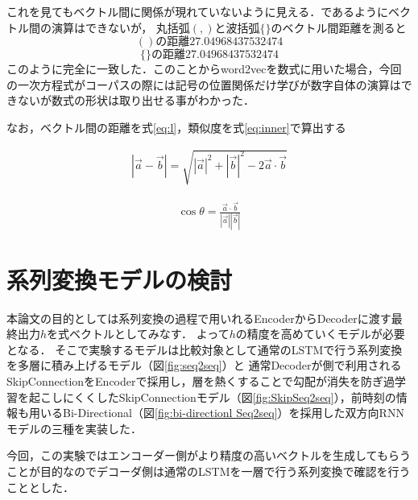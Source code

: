 \documentclass[a4j,11pt,report]{jsbook}
\begin{document}
\begin{multicols}{2}


\end{multicols}



これを見てもベクトル間に関係が現れていないように見える．\cite{seq2seq}であるようにベクトル間の演算はできないが，
丸括弧$(,)$と波括弧$\{ \}$のベクトル間距離を測ると
\[
( ) の距離 27.04968437532474
\]
\[
\{ \} の距離 27.04968437532474
\]
このように完全に一致した．このことからword2vecを数式に用いた場合，今回の一次方程式がコーパスの際には記号の位置関係だけ学びが数字自体の演算はできないが数式の形状は取り出せる事がわかった．

なお，ベクトル間の距離を式\ref{eq:l}，類似度を式\ref{eq:inner}で算出する


\begin{equation}
  \label{eq:l}
  \begin{split}
    |\vec{a}-\vec{b}| =  \sqrt{|\vec{a}|^2 + |\vec{b}|^2 - 2  \vec{a} \cdot \vec{b}}
  \end{split}
\end{equation}

\begin{equation}
  \label{eq:inner}
  \begin{split}
    \cos \theta = \frac{\vec{a} \cdot \vec{b}}{|\vec{a}| |\vec{b}|}
  \end{split}
\end{equation}

\section{系列変換モデルの検討}
本論文の目的としては系列変換の過程で用いれるEncoderからDecoderに渡す最終出力$h$を式ベクトルとしてみなす．
よって$h$の精度を高めていくモデルが必要となる．
そこで実験するモデルは比較対象として通常のLSTMで行う系列変換を多層に積み上げるモデル（図\ref{fig:seq2seq}）と
通常Decoderが側で利用されるSkipConnectionをEncoderで採用し，層を熱くすることで勾配が消失を防ぎ過学習を起こしにくくしたSkipConnectionモデル（図\ref{fig:SkipSeq2seq}），前時刻の情報も用いるBi-Directional（図\ref{fig:bi-directionl Seq2seq}）を採用した双方向RNNモデルの三種を実装した．

今回，この実験ではエンコーダー側がより精度の高いベクトルを生成してもらうことが目的なのでデコーダ側は通常のLSTMを一層で行う系列変換で確認を行うこととした．
\end{document}
